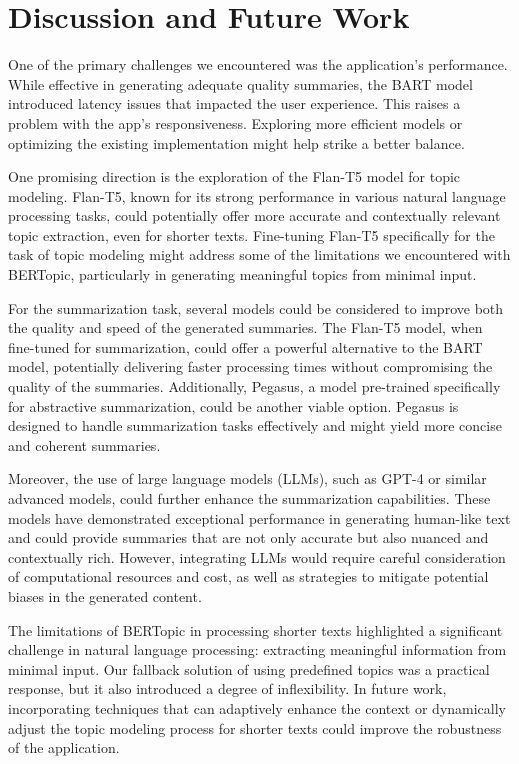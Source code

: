\section{Discussion and Future Work}\label{sec:discussion}
One of the primary challenges we encountered was the application's performance. While effective in generating adequate quality summaries, the BART model introduced latency issues that impacted the user experience. This raises a problem with the app's responsiveness. Exploring more efficient models or optimizing the existing implementation might help strike a better balance.

One promising direction is the exploration of the Flan-T5 model for topic modeling. Flan-T5, known for its strong performance in various natural language processing tasks, could potentially offer more accurate and contextually relevant topic extraction, even for shorter texts. Fine-tuning Flan-T5 specifically for the task of topic modeling might address some of the limitations we encountered with BERTopic, particularly in generating meaningful topics from minimal input.

For the summarization task, several models could be considered to improve both the quality and speed of the generated summaries. The Flan-T5 model, when fine-tuned for summarization, could offer a powerful alternative to the BART model, potentially delivering faster processing times without compromising the quality of the summaries. Additionally, Pegasus, a model pre-trained specifically for abstractive summarization, could be another viable option. Pegasus is designed to handle summarization tasks effectively and might yield more concise and coherent summaries.

Moreover, the use of large language models (LLMs), such as GPT-4 or similar advanced models, could further enhance the summarization capabilities. These models have demonstrated exceptional performance in generating human-like text and could provide summaries that are not only accurate but also nuanced and contextually rich. However, integrating LLMs would require careful consideration of computational resources and cost, as well as strategies to mitigate potential biases in the generated content.\citep{shakil2024evaluating}

The limitations of BERTopic in processing shorter texts highlighted a significant challenge in natural language processing: extracting meaningful information from minimal input. Our fallback solution of using predefined topics was a practical response, but it also introduced a degree of inflexibility. In future work, incorporating techniques that can adaptively enhance the context or dynamically adjust the topic modeling process for shorter texts could improve the robustness of the application.


